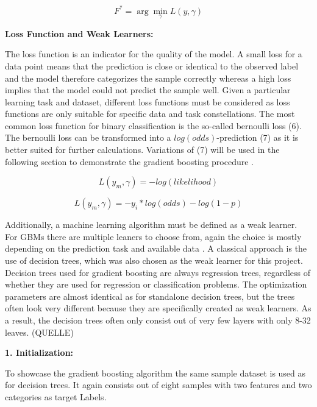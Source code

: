\begin{equation}
F^{*} = \arg \min_{\gamma} L(y,\gamma)
\end{equation}

\textbf{Loss Function and Weak Learners:}

The loss function is an indicator for the quality of the model. A small loss for a data point 
means that the prediction is close or identical to the observed label and the model therefore 
categorizes the sample correctly whereas a high loss implies that the model could not predict 
the sample well. Given a particular learning task and dataset, different loss functions must 
be considered as loss functions are only suitable for specific data and task constellations. The most common 
loss function for binary classification is the so-called bernoulli loss (6). The bernoulli loss 
can be transformed into a \(log(odds)\)-prediction (7) as it is better suited for further calculations. 
Variations of (7) will be used in the following section to demonstrate the gradient boosting 
procedure \cite[3.1]{Natekin2013}. 

\begin{equation}
L(y_{m}, \gamma) = - log(likelihood)
\end{equation} 

\begin{equation}
L(y_{m}, \gamma) = - y_{i} * log(odds) - log(1-p)
\end{equation}

Additionally, a machine learning algorithm must be defined as a weak learner. For \ac{GBM}s there 
are multiple leaners to choose from, again the choice is mostly depending on the prediction 
task and available data \cite[3.2]{Natekin2013}. A classical approach is the use of decision trees, which was also 
chosen as the weak learner for this project. Decision trees used for gradient boosting are 
always regression trees, regardless of whether they are used for regression or classification 
problems. The optimization parameters are almost identical as for standalone decision trees, 
but the trees often look very different because they are specifically created as weak learners. 
As a result, the decision trees often only consist out of very few layers with only 8-32 leaves.
(QUELLE)

\textbf{1. Initialization:}

To showcase the gradient boosting algorithm the same sample dataset is used as for decision trees. 
It again consists out of eight samples with two features and two categories as target Labels. 

